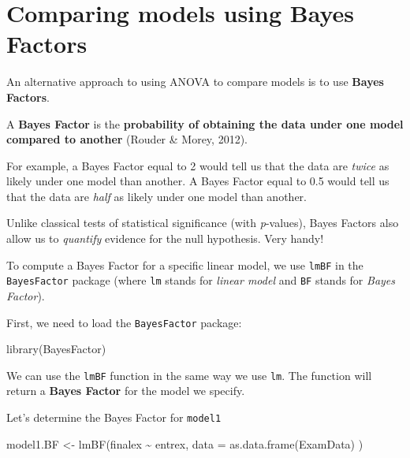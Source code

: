 \documentclass[
]{book}
\newenvironment{Shaded}{\begin{snugshade}}{\end{snugshade}}
\newcommand{\AttributeTok}[1]{\textcolor[rgb]{0.77,0.63,0.00}{#1}}
\newcommand{\FunctionTok}[1]{\textcolor[rgb]{0.00,0.00,0.00}{#1}}
\newcommand{\NormalTok}[1]{#1}
\newcommand{\OtherTok}[1]{\textcolor[rgb]{0.56,0.35,0.01}{#1}}
\newcommand{\SpecialCharTok}[1]{\textcolor[rgb]{0.00,0.00,0.00}{#1}}
\newcommand{\StringTok}[1]{\textcolor[rgb]{0.31,0.60,0.02}{#1}}
\theoremstyle{definition}
\theoremstyle{definition}
\theoremstyle{definition}
\theoremstyle{definition}
\theoremstyle{remark}
\begin{document}
\hypertarget{comparing-models-using-bayes-factors}{%
\section{Comparing models using Bayes Factors}\label{comparing-models-using-bayes-factors}}

An alternative approach to using ANOVA to compare models is to use \textbf{Bayes Factors}.

\hfill\break
A \textbf{Bayes Factor} is the \textbf{probability of obtaining the data under one model compared to another} (Rouder \& Morey, 2012).

\hfill\break
For example, a Bayes Factor equal to 2 would tell us that the data are \emph{twice} as likely under one model than another. A Bayes Factor equal to 0.5 would tell us that the data are \emph{half} as likely under one model than another.

\hfill\break
Unlike classical tests of statistical significance (with \emph{p}-values), Bayes Factors also allow us to \emph{quantify} evidence for the null hypothesis. Very handy!

\hfill\break
To compute a Bayes Factor for a specific linear model, we use \texttt{lmBF} in the \texttt{BayesFactor} package (where \texttt{lm} stands for \emph{linear model} and \texttt{BF} stands for \emph{Bayes Factor}).

\hfill\break
First, we need to load the \texttt{BayesFactor} package:

\begin{Shaded}
\begin{Highlighting}[]
\FunctionTok{library}\NormalTok{(}\StringTok{\textquotesingle{}BayesFactor\textquotesingle{}}\NormalTok{)}
\end{Highlighting}
\end{Shaded}

We can use the \texttt{lmBF} function in the same way we use \texttt{lm}. The function will return a \textbf{Bayes Factor} for the model we specify.

\hfill\break
Let's determine the Bayes Factor for \texttt{model1}

\begin{Shaded}
\begin{Highlighting}[]
\NormalTok{model1.BF }\OtherTok{\textless{}{-}} \FunctionTok{lmBF}\NormalTok{(finalex }\SpecialCharTok{\textasciitilde{}}\NormalTok{ entrex, }\AttributeTok{data =} \FunctionTok{as.data.frame}\NormalTok{(ExamData) )  }
\end{Highlighting}
\end{Shaded}
\end{document}
